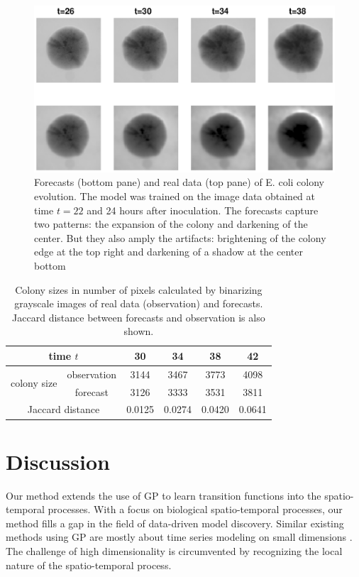 \documentclass[smallextended,natbib]{svjour3}       %
\begin{document}
\begin{figure}[h]
\centerline{\includegraphics[width=\textwidth]{chapterGP/figures/ecoli100by100}}
\caption[]{\label{fig:ecoli} Forecasts (bottom pane) and real data (top pane) of E. coli colony evolution. The model was trained on the image data obtained at time $t=22$ and 24 hours after inoculation. The forecasts capture two patterns: the expansion of the colony and darkening of the center. But they also amply the artifacts: brightening of the colony edge at the top right and darkening of a shadow at the center bottom}
\end{figure}

\begin{table}[h]
\begin{center}
\caption{Colony sizes in number of pixels calculated by binarizing grayscale images of real data (observation) and forecasts. Jaccard distance between forecasts and observation is also shown.}
\label{tab:colony-size-jd}
\begin{tabular}{cccccc} \hline
 \multicolumn{2}{c}{time $t$ } & 30 & 34 & 38 & 42\\ \hline\hline
\multirow{2}{5em}{colony size} & observation & 3144 & 3467 & 3773 & 4098 \\
& forecast & 3126 & 3333 & 3531 & 3811 \\ \hline
 \multicolumn{2}{c}{Jaccard distance} & 0.0125 & 0.0274 & 0.0420 & 0.0641 \\ \hline
\end{tabular}
\end{center}
\end{table}



\section{Discussion} \label{sec:GP-conclude}
Our method extends the use of GP to learn transition functions into the spatio-temporal processes. With a focus on biological spatio-temporal processes, our method fills a gap in the field of data-driven model discovery. Similar existing methods using GP are mostly about time series modeling on small dimensions \citep{Roberts2013}. The challenge of high dimensionality is circumvented by recognizing the local nature of the spatio-temporal process.
\end{document}
